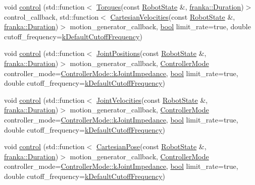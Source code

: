 \begin{Indent}
\begin{DoxyCompactItemize}
\item 
void \hyperlink{classfranka_1_1Robot_a3cc02de96810eebc74f499f5821f2ac9}{control} (std\+::function$<$ \hyperlink{classfranka_1_1Torques}{Torques}(const \hyperlink{structfranka_1_1RobotState}{Robot\+State} \&, \hyperlink{classfranka_1_1Duration}{franka\+::\+Duration})$>$ control\+\_\+callback, std\+::function$<$ \hyperlink{classfranka_1_1CartesianVelocities}{Cartesian\+Velocities}(const \hyperlink{structfranka_1_1RobotState}{Robot\+State} \&, \hyperlink{classfranka_1_1Duration}{franka\+::\+Duration})$>$ motion\+\_\+generator\+\_\+callback, \hyperlink{classbool}{bool} limit\+\_\+rate=true, double cutoff\+\_\+frequency=\hyperlink{namespacefranka_ad8e3b7da346e03181ab5ac138a4171d4}{k\+Default\+Cutoff\+Frequency})
\item 
void \hyperlink{classfranka_1_1Robot_a8a41a2f208cc0c7e68569a550af4e1b2}{control} (std\+::function$<$ \hyperlink{classfranka_1_1JointPositions}{Joint\+Positions}(const \hyperlink{structfranka_1_1RobotState}{Robot\+State} \&, \hyperlink{classfranka_1_1Duration}{franka\+::\+Duration})$>$ motion\+\_\+generator\+\_\+callback, \hyperlink{namespacefranka_a3e20bc77587e2c0c53598753e3f4816b}{Controller\+Mode} controller\+\_\+mode=\hyperlink{namespacefranka_a3e20bc77587e2c0c53598753e3f4816baa7cd8fc7552b5b9c50684e57f032d724}{Controller\+Mode\+::k\+Joint\+Impedance}, \hyperlink{classbool}{bool} limit\+\_\+rate=true, double cutoff\+\_\+frequency=\hyperlink{namespacefranka_ad8e3b7da346e03181ab5ac138a4171d4}{k\+Default\+Cutoff\+Frequency})
\item 
void \hyperlink{classfranka_1_1Robot_a7b2856e3c3c7a5582fd16f7414c30221}{control} (std\+::function$<$ \hyperlink{classfranka_1_1JointVelocities}{Joint\+Velocities}(const \hyperlink{structfranka_1_1RobotState}{Robot\+State} \&, \hyperlink{classfranka_1_1Duration}{franka\+::\+Duration})$>$ motion\+\_\+generator\+\_\+callback, \hyperlink{namespacefranka_a3e20bc77587e2c0c53598753e3f4816b}{Controller\+Mode} controller\+\_\+mode=\hyperlink{namespacefranka_a3e20bc77587e2c0c53598753e3f4816baa7cd8fc7552b5b9c50684e57f032d724}{Controller\+Mode\+::k\+Joint\+Impedance}, \hyperlink{classbool}{bool} limit\+\_\+rate=true, double cutoff\+\_\+frequency=\hyperlink{namespacefranka_ad8e3b7da346e03181ab5ac138a4171d4}{k\+Default\+Cutoff\+Frequency})
\item 
void \hyperlink{classfranka_1_1Robot_a6e59bd7b50b2de2e9e54f0b60d1a552e}{control} (std\+::function$<$ \hyperlink{classfranka_1_1CartesianPose}{Cartesian\+Pose}(const \hyperlink{structfranka_1_1RobotState}{Robot\+State} \&, \hyperlink{classfranka_1_1Duration}{franka\+::\+Duration})$>$ motion\+\_\+generator\+\_\+callback, \hyperlink{namespacefranka_a3e20bc77587e2c0c53598753e3f4816b}{Controller\+Mode} controller\+\_\+mode=\hyperlink{namespacefranka_a3e20bc77587e2c0c53598753e3f4816baa7cd8fc7552b5b9c50684e57f032d724}{Controller\+Mode\+::k\+Joint\+Impedance}, \hyperlink{classbool}{bool} limit\+\_\+rate=true, double cutoff\+\_\+frequency=\hyperlink{namespacefranka_ad8e3b7da346e03181ab5ac138a4171d4}{k\+Default\+Cutoff\+Frequency})

\end{DoxyCompactItemize}
\end{Indent}
